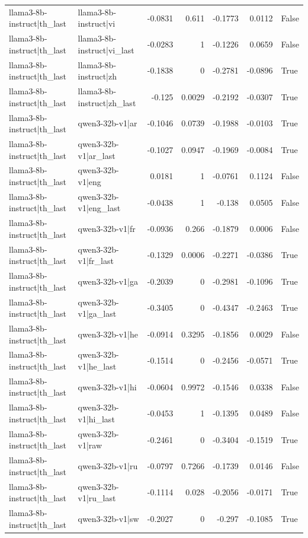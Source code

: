 \begin{table}
\begin{tabular}{l l r r r r l}
llama3-8b-instruct|th_last & llama3-8b-instruct|vi & -0.0831 & 0.611 & -0.1773 & 0.0112 & False \\
llama3-8b-instruct|th_last & llama3-8b-instruct|vi_last & -0.0283 & 1 & -0.1226 & 0.0659 & False \\
llama3-8b-instruct|th_last & llama3-8b-instruct|zh & -0.1838 & 0 & -0.2781 & -0.0896 & True \\
llama3-8b-instruct|th_last & llama3-8b-instruct|zh_last & -0.125 & 0.0029 & -0.2192 & -0.0307 & True \\
llama3-8b-instruct|th_last & qwen3-32b-v1|ar & -0.1046 & 0.0739 & -0.1988 & -0.0103 & True \\
llama3-8b-instruct|th_last & qwen3-32b-v1|ar_last & -0.1027 & 0.0947 & -0.1969 & -0.0084 & True \\
llama3-8b-instruct|th_last & qwen3-32b-v1|eng & 0.0181 & 1 & -0.0761 & 0.1124 & False \\
llama3-8b-instruct|th_last & qwen3-32b-v1|eng_last & -0.0438 & 1 & -0.138 & 0.0505 & False \\
llama3-8b-instruct|th_last & qwen3-32b-v1|fr & -0.0936 & 0.266 & -0.1879 & 0.0006 & False \\
llama3-8b-instruct|th_last & qwen3-32b-v1|fr_last & -0.1329 & 0.0006 & -0.2271 & -0.0386 & True \\
llama3-8b-instruct|th_last & qwen3-32b-v1|ga & -0.2039 & 0 & -0.2981 & -0.1096 & True \\
llama3-8b-instruct|th_last & qwen3-32b-v1|ga_last & -0.3405 & 0 & -0.4347 & -0.2463 & True \\
llama3-8b-instruct|th_last & qwen3-32b-v1|he & -0.0914 & 0.3295 & -0.1856 & 0.0029 & False \\
llama3-8b-instruct|th_last & qwen3-32b-v1|he_last & -0.1514 & 0 & -0.2456 & -0.0571 & True \\
llama3-8b-instruct|th_last & qwen3-32b-v1|hi & -0.0604 & 0.9972 & -0.1546 & 0.0338 & False \\
llama3-8b-instruct|th_last & qwen3-32b-v1|hi_last & -0.0453 & 1 & -0.1395 & 0.0489 & False \\
llama3-8b-instruct|th_last & qwen3-32b-v1|raw & -0.2461 & 0 & -0.3404 & -0.1519 & True \\
llama3-8b-instruct|th_last & qwen3-32b-v1|ru & -0.0797 & 0.7266 & -0.1739 & 0.0146 & False \\
llama3-8b-instruct|th_last & qwen3-32b-v1|ru_last & -0.1114 & 0.028 & -0.2056 & -0.0171 & True \\
llama3-8b-instruct|th_last & qwen3-32b-v1|sw & -0.2027 & 0 & -0.297 & -0.1085 & True \\

\end{tabular}
\end{table}
